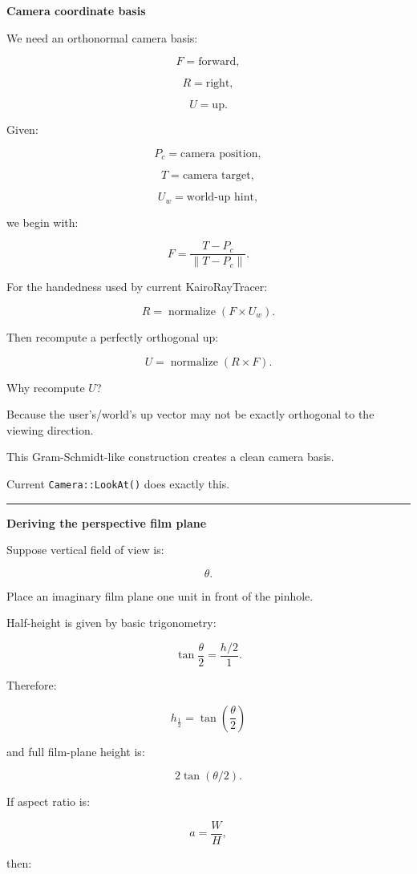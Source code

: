 \textbf{Camera coordinate basis}

We need an orthonormal camera basis:

\[
F=\text{forward},
\]

\[
R=\text{right},
\]

\[
U=\text{up}.
\]

Given:

\[
P_c=\text{camera position},
\]

\[
T=\text{camera target},
\]

\[
U_w=\text{world-up hint},
\]

we begin with:

\[
F=
\frac{T-P_c}
{\|T-P_c\|}.
\]

For the handedness used by current KairoRayTracer:

\[
R=
\operatorname{normalize}
(
F\times U_w
).
\]

Then recompute a perfectly orthogonal up:

\[
U=
\operatorname{normalize}
(
R\times F
).
\]

Why recompute \(U\)?

Because the user's/world's up vector may not be exactly orthogonal to the viewing direction.

This Gram-Schmidt-like construction creates a clean camera basis.

Current \texttt{Camera::LookAt()} does exactly this.

\begin{center}\rule{0.5\linewidth}{0.5pt}\end{center}

\textbf{Deriving the perspective film plane}

Suppose vertical field of view is:

\[
\theta.
\]

Place an imaginary film plane one unit in front of the pinhole.

Half-height is given by basic trigonometry:

\[
\tan\frac{\theta}{2}
=
\frac{h/2}{1}.
\]

Therefore:

\[
\boxed{
h_{\frac12}
=
\tan\left(\frac{\theta}{2}\right)
}
\]

and full film-plane height is:

\[
2\tan(\theta/2).
\]

If aspect ratio is:

\[
a=\frac{W}{H},
\]

then:

